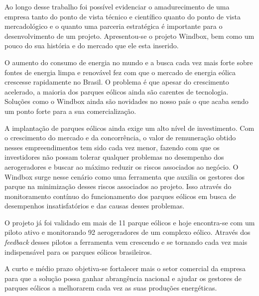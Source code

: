 
\label{Cap:consideracoesFinais}

Ao longo desse trabalho foi possível evidenciar o amadurecimento de uma empresa tanto do ponto de vista técnico e científico quanto do ponto de vista mercadológico e o quanto uma parceria estratégica é importante para o desenvolvimento de um projeto. Apresentou-se o projeto Windbox, bem como um pouco do sua história e do mercado que ele esta inserido. 

O aumento do consumo de energia no mundo e a busca cada vez mais forte sobre fontes de energia limpa e renovável fez com que o mercado de energia eólica crescesse rapidamente no Brasil. O problema é que apesar do crescimento acelerado, a maioria dos parques eólicos ainda são carentes de tecnologia. Soluções como o Windbox ainda são novidades no nosso país o que acaba sendo um ponto forte para a sua comercialização.

A implantação de parques eólicos ainda exige um alto nível de investimento. Com o crescimento do mercado e da concorrência, o valor de remuneração obtido nesses empreendimentos tem sido cada vez menor, fazendo com que os investidores não possam tolerar qualquer problemas no desempenho dos aerogeradores e buscar ao máximo reduzir os riscos associados ao negócio. O Windbox surge nesse cenário como uma ferramenta que auxilia os gestores dos parque na minimização desses riscos associados ao projeto. Isso através do monitoramento contínuo do funcionamento dos parques eólicos em busca de desempenhos insatisfatórios e das causas desses problemas.

O projeto já foi validado em mais de 11 parque eólicos e hoje encontra-se com um piloto ativo e monitorando 92 aerogeradores de um complexo eólico. Através dos \textit{feedback} desses pilotos a ferramenta vem crescendo e se tornando cada vez mais indispensável para os parques eólicos brasileiros. 

A curto e médio prazo objetiva-se fortalecer mais o setor comercial da empresa para que a solução possa ganhar abrangência nacional e ajudar os gestores de parques eólicos a melhorarem cada vez as suas produções energéticas.
